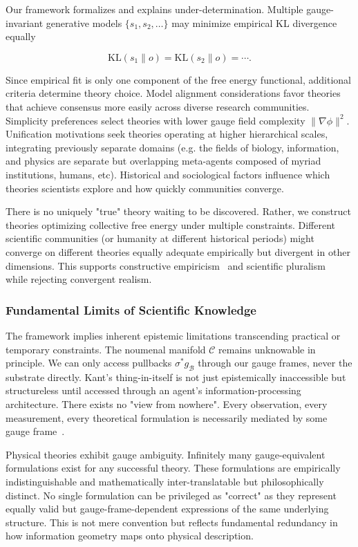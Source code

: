 \documentclass[11pt]{article}
\begin{document}
Our framework formalizes and explains under-determination. Multiple gauge-invariant generative models $\{s_1, s_2, \ldots\}$ may minimize empirical KL divergence equally

\begin{equation}
\mathrm{KL}(s_1 \| o) = \mathrm{KL}(s_2 \| o) = \cdots.
\end{equation}

Since empirical fit is only one component of the free energy functional, additional criteria determine theory choice. Model alignment considerations favor theories that achieve consensus more easily across diverse research communities. Simplicity preferences select theories with lower gauge field complexity $\|\nabla\phi\|^2$.  Unification motivations seek theories operating at higher hierarchical scales, integrating previously separate domains (e.g. the fields of biology, information, and physics are separate but overlapping meta-agents composed of myriad institutions, humans, etc). Historical and sociological factors influence which theories scientists explore and how quickly communities converge.

There is no uniquely "true" theory waiting to be discovered. Rather, we construct theories optimizing collective free energy under multiple constraints. Different scientific communities (or humanity at different historical periods) might converge on different theories equally adequate empirically but divergent in other dimensions. This supports constructive empiricism~\cite{vanFraassen1980} and scientific pluralism~\cite{Longino2002} while rejecting convergent realism.

\subsubsection{Fundamental Limits of Scientific Knowledge}

The framework implies inherent epistemic limitations transcending practical or temporary constraints. The noumenal manifold $\mathcal{C}$ remains unknowable in principle. We can only access pullbacks $\sigma^* g_{\mathcal{B}}$ through our gauge frames, never the substrate directly. Kant's thing-in-itself is not just epistemically inaccessible but structureless until accessed through an agent's information-processing architecture. There exists no "view from nowhere".  Every observation, every measurement, every theoretical formulation is necessarily mediated by some gauge frame~\cite{Nagel1986}.

Physical theories exhibit gauge ambiguity.  Infinitely many gauge-equivalent formulations exist for any successful theory. These formulations are empirically indistinguishable and mathematically inter-translatable but philosophically distinct. No single formulation can be privileged as "correct" as they represent equally valid but gauge-frame-dependent expressions of the same underlying structure. This is not mere convention but reflects fundamental redundancy in how information geometry maps onto physical description.
\end{document}
